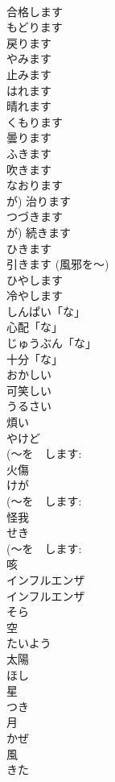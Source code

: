 \documentclass[8pt]{extreport}
\begin{document}
\begin{CJK}{UTF8}{min}
\\	合格します	
\\	もどります	
\\	戻ります		
\\	やみます	
\\	止みます		
\\	はれます	
\\	晴れます	
\\	くもります	
\\	曇ります	
\\	ふきます	
\\	吹きます		
\\	なおります	
\\	が)	治ります	
\\	つづきます	
\\	が)	続きます		
\\	ひきます	
\\	引きます (風邪を～)	
\\	ひやします	
\\	冷やします	
\\	しんぱい「な」	
\\	心配「な」	
\\	じゅうぶん「な」	
\\	十分「な」		
\\	おかしい	
\\	可笑しい	
\\	うるさい	
\\	煩い		
\\	やけど	
\\	(〜を　します: 
\\	火傷		
\\	けが	
\\	(〜を　します: 
\\	怪我	
\\	せき	
\\	(〜を　します: 
\\	咳	
\\	インフルエンザ	
\\	インフルエンザ	
\\	そら	
\\	空	
\\	たいよう	
\\	太陽		
\\	ほし	
\\	星	
\\	つき	
\\	月		
\\	かぜ	
\\	風		
\\	きた	

\end{CJK}
\end{document}
